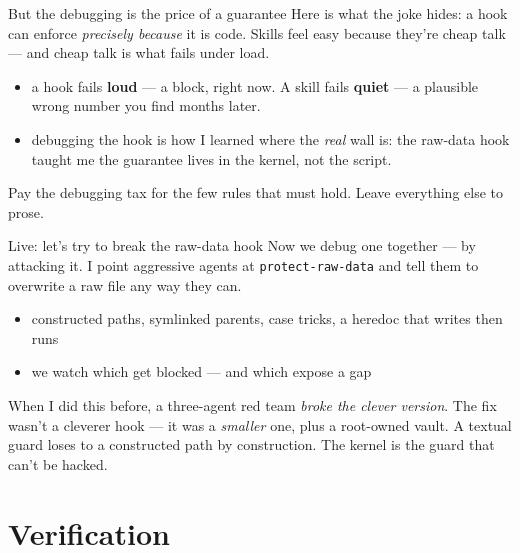 \documentclass[aspectratio=169,11pt]{beamer}
\begin{document}
\begin{frame}{But the debugging is the price of a guarantee}
Here is what the joke hides: a hook can enforce \emph{precisely because} it is code. Skills feel easy because they're cheap talk --- and cheap talk is what fails under load.
\vspace{0.3cm}
\begin{itemize}\setlength\itemsep{0.28em}
    \item a hook fails \textbf{loud} --- a block, right now. A skill fails \textbf{quiet} --- a plausible wrong number you find months later.
    \item debugging the hook is how I learned where the \emph{real} wall is: the raw-data hook taught me the guarantee lives in the kernel, not the script.
\end{itemize}
\vspace{0.12cm}
\alert{Pay the debugging tax for the few rules that must hold. Leave everything else to prose.}
\end{frame}

\begin{frame}{Live: let's try to break the raw-data hook}
Now we debug one together --- by attacking it. I point aggressive agents at \texttt{protect-raw-data} and tell them to overwrite a raw file any way they can.
\vspace{0.3cm}
\begin{itemize}\setlength\itemsep{0.25em}
    \item constructed paths, symlinked parents, case tricks, a heredoc that writes then runs
    \item we watch which get blocked --- and which expose a gap
\end{itemize}
\vspace{0.25cm}
When I did this before, a three-agent red team \emph{broke the clever version}. The fix wasn't a cleverer hook --- it was a \emph{smaller} one, plus a root-owned vault.
\vspace{0.1cm}
\alert{A textual guard loses to a constructed path by construction. The kernel is the guard that can't be hacked.}
\end{frame}

\section{Verification}
\end{document}

